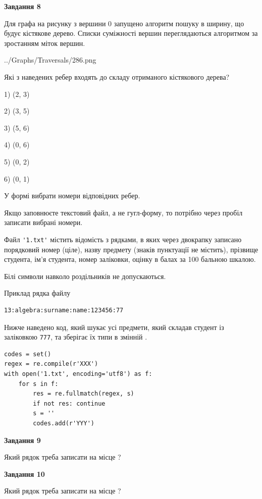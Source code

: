 \documentclass[12pt, ukrainian]{article}
\def\code#1{\Verb!#1!}
\begin{document}
{\begin {large}
{\begin {center}\textbf{Завдання 8}\end {center}}\par
Для графа на рисунку з вершини 0 запущено алгоритм пошуку в ширину, що будує кістякове дерево. Списки суміжності вершин переглядаються алгоритмом за зростанням міток вершин.\par
\begin{center}
	{../Graphs/Traversals/286.png}
\end{center}
\par Які з наведених ребер входять до складу отриманого кістякового дерева?\par
1) (2, 3)\par
2) (3, 5)\par
3) (5, 6)\par
4) (0, 6)\par
5) (0, 2)\par
6) (0, 1)\par
{\vskip 15pt} У формі вибрати номери відповідних ребер.


Якщо заповнюєте текстовий файл, а не гугл-форму, то потрібно через пробіл записа\-ти вибрані номери.\par
\newpage


Файл \code{'1.txt'} містить відомість з рядками, в яких через двокрапку записано поряд\-ковий номер (ціле), назву предмету (знаків пунктуації не містить), прізвище студента, ім'я студента, номер заліковки, оцінку в балах за 100 бальною шкалою.

Білі символи навколо роздільників не допускаються.

Приклад рядка файлу



\begin{verbatim}
13:algebra:surname:name:123456:77
\end{verbatim}


Нижче наведено код, який шукає усі предмети, який складав студент із заліковкою \code{777}, та зберігає їх типи в змінній .



\begin{verbatim}
codes = set()
regex = re.compile(r'XXX')
with open('1.txt', encoding='utf8') as f:
    for s in f:
        res = re.fullmatch(regex, s)
        if not res: continue
        s = ''
        codes.add(r'YYY')
\end{verbatim}


{\begin {center}\textbf{Завдання 9}\end {center}}\par
Який рядок треба записати на місце  ?\par
\vspace{5mm}


{\begin {center}\textbf{Завдання 10}\end {center}}\par
Який рядок треба записати на місце  ?\par


\newpage


\end {large}}
\end{document}
